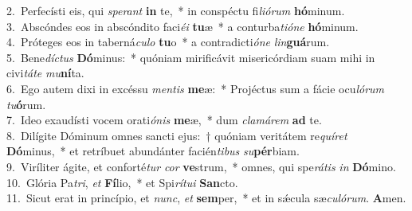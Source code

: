 {2.~}Perfecísti eis, qui \textit{spe}\textit{rant} \textbf{in} te,~* in conspéctu fi\textit{li}\textit{ó}\textit{rum} \textbf{hó}minum.\\
{3.~}Abscóndes eos in abscóndito faci\textit{é}\textit{i} \textbf{tu}æ~* a conturba\textit{ti}\textit{ó}\textit{ne} \textbf{hó}minum.\\
{4.~}Próteges eos in taberná\textit{cu}\textit{lo} \textbf{tu}o~* a contradicti\textit{ó}\textit{ne} \textit{lin}\textbf{guá}rum.\\
{5.~}Bene\textit{dí}\textit{ctus} \textbf{Dó}minus:~* quóniam mirificávit misericórdiam suam mihi in civi\textit{tá}\textit{te} \textit{mu}\textbf{ní}ta.\\
{6.~}Ego autem dixi in excéssu \textit{men}\textit{tis} \textbf{me}æ:~* Projéctus sum a fácie ocu\textit{ló}\textit{rum} \textit{tu}\textbf{ó}rum.\\
{7.~}Ideo exaudísti vocem orati\textit{ó}\textit{nis} \textbf{me}æ,~* dum \textit{cla}\textit{má}\textit{rem} \textbf{ad} te.\\
{8.~}Dilígite Dóminum omnes sancti ejus:~† quóniam veritátem re\textit{quí}\textit{ret} \textbf{Dó}minus,~* et retríbuet abundánter facién\textit{ti}\textit{bus} \textit{su}\textbf{pér}biam.\\
{9.~}Viríliter ágite, et conforté\textit{tur} \textit{cor} \textbf{ve}strum,~* omnes, qui spe\textit{rá}\textit{tis} \textit{in} \textbf{Dó}mino.\\
{10.~}Glória Pa\textit{tri}, \textit{et} \textbf{Fí}lio,~* et Spi\textit{rí}\textit{tu}\textit{i} \textbf{San}cto.\\
{11.~}Sicut erat in princípio, et \textit{nunc}, \textit{et} \textbf{sem}per,~* et in sǽcula sæ\textit{cu}\textit{ló}\textit{rum}. \textbf{A}men.\\
